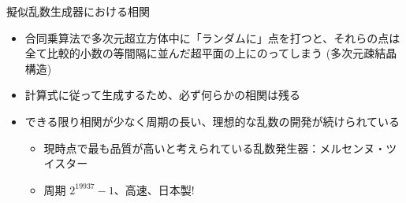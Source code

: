\documentclass[dvipdfmx]{beamer}
\begin{document}
\begin{frame}[t,fragile]{擬似乱数生成器における相関}
  \begin{itemize}
  \item 合同乗算法で多次元超立方体中に「ランダムに」点を打つと、それらの点は全て比較的小数の等間隔に並んだ超平面の上にのってしまう (多次元疎結晶構造)
  \item 計算式に従って生成するため、必ず何らかの相関は残る
  \item できる限り相関が少なく周期の長い、理想的な乱数の開発が続けられている
    \begin{itemize}
    \item 現時点で最も品質が高いと考えられている乱数発生器：メルセンヌ・ツイスター
    \item 周期 $2^{19937}-1$、高速、日本製!
    \end{itemize}
  \end{itemize}
\end{frame}
\end{document}
